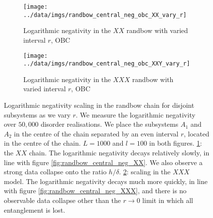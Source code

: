 \begin{figure}
     \centering
     \begin{subfigure}[b]{\textwidth}
       \centering
    \texttt{[image: ../data/imgs/randbow\_central\_neg\_obc\_XX\_vary\_r]}
    \caption{Logarithmic negativity in the $XX$ randbow with varied interval $r$, OBC}
    \label{fig:randbow_central_neg_vary_r_XX}    
    \end{subfigure}%
     \hfill
     \begin{subfigure}[b]{\textwidth}
         \centering
    \texttt{[image: ../data/imgs/randbow\_central\_neg\_obc\_XXY\_vary\_r]}
    \caption{Logarithmic negativity in the $XXX$ randbow with varied interval $r$, OBC}
    \label{fig:randbow_central_neg_vary_r_XXX} 
         \end{subfigure}
            \caption{Logarithmic negativity scaling in the randbow chain for disjoint subsystems as we vary $r$. We measure the logarithmic negativity over $50, 000$ disorder realisations. We place the subsystems $A_1$ and $A_2$ in the centre of the chain separated by an even interval $r$, located in the centre of the chain. $L =1000$ and $l = 100$ in both figures. \ref{fig:randbow_central_neg_vary_r_XX}: the $XX$ chain. The logarithmic negativity decays relatively slowly, in line with figure \ref{fig:randbow_central_neg_XX}. We also observe a strong data collapse onto the ratio $h / \delta$. \ref{fig:randbow_central_neg_vary_r_XXX}: scaling in the $XXX$ model. The logarithmic negativity decays much more quickly, in line with figure \ref{fig:randbow_central_neg_XXX}, and there is no observable data collapse other than the $r \to 0$ limit in which all entanglement is lost.}
        \label{fig:randbow_negativity_scaling_vary_r}
\end{figure}




